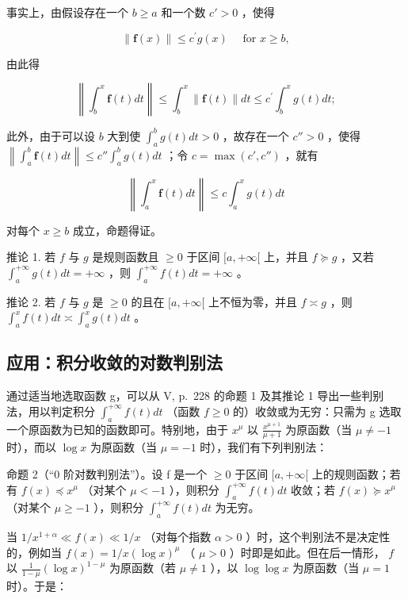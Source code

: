 事实上，由假设存在一个 \(b \geqslant a\) 和一个数 \(c' > 0\) ，使得

\[
\| \mathbf {f} (x) \| \leqslant c ^ {\prime} g (x) \quad \text {   for   } x \geqslant b,
\]

由此得

\[
\left\| \int_ {b} ^ {x} \mathbf {f} (t) d t \right\| \leqslant \int_ {b} ^ {x} \| \mathbf {f} (t) \| d t \leqslant c ^ {\prime} \int_ {b} ^ {x} g (t) d t;
\]

此外，由于可以设 \(b\) 大到使 \(\int_{a}^{b} g(t) dt > 0\) ，故存在一个 \(c'' > 0\) ，使得 \(\left\| \int_{a}^{b} \mathbf{f}(t) dt \right\| \leqslant c'' \int_{a}^{b} g(t) dt\) ；令 \(c = \max(c', c'')\) ，就有

\[
\left\| \int_ {a} ^ {x} \mathbf {f} (t) d t \right\| \leqslant c \int_ {a} ^ {x} g (t) d t
\]

对每个 \(x \geqslant b\) 成立，命题得证。

推论 1. 若 \(f\) 与 \(g\) 是规则函数且 \(\geqslant 0\) 于区间 \([a, +\infty[\) 上，并且 \(f \succcurlyeq g\) ，又若 \(\int_{a}^{+\infty} g(t) dt = +\infty\) ，则 \(\int_{a}^{+\infty} f(t) dt = +\infty\) 。

推论 2. 若 \(f\) 与 \(g\) 是 \(\geqslant 0\) 的且在 \([a, +\infty[\) 上不恒为零，并且 \(f \asymp g\) ，则 \(\int_{a}^{x} f(t) dt \asymp \int_{a}^{x} g(t) dt\) 。

\subsection{应用：积分收敛的对数判别法}

通过适当地选取函数 g，可以从 V, p.~228 的命题 1 及其推论 1 导出一些判别法，用以判定积分 \(\int_{a}^{+\infty} f(t) dt\) （函数 \(f \geqslant 0\) 的）收敛或为无穷：只需为 g 选取一个原函数为已知的函数即可。特别地，由于 \(x^{\mu}\) 以 \(\frac{x^{\mu+1}}{\mu+1}\) 为原函数（当 \(\mu \neq -1\) 时），而以 \(\log x\) 为原函数（当 \(\mu = -1\) 时），我们有下列判别法：

命题 2（``0 阶对数判别法''）。设 f 是一个 \(\geqslant 0\) 于区间 \([a, +\infty[\) 上的规则函数；若有 \(f(x) \preccurlyeq x^{\mu}\) （对某个 \(\mu < -1\) ），则积分 \(\int_{a}^{+\infty} f(t) dt\) 收敛；若 \(f(x) \succcurlyeq x^{\mu}\) （对某个 \(\mu \geqslant -1\) ），则积分 \(\int_{a}^{+\infty} f(t) dt\) 为无穷。

当 \(1 / x^{1 + \alpha} \ll f(x) \ll 1 / x\) （对每个指数 \(\alpha > 0\) ）时，这个判别法不是决定性的，例如当 \(f(x) = 1 / x(\log x)^{\mu}\) （ \(\mu > 0\) ）时即是如此。但在后一情形， \(f\) 以 \(\frac{1}{1 - \mu} (\log x)^{1 - \mu}\) 为原函数（若 \(\mu \neq 1\) ），以 \(\log \log x\) 为原函数（当 \(\mu = 1\) 时）。于是：

